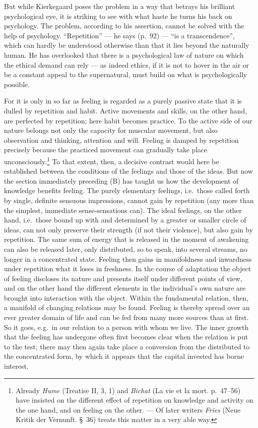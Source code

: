 \documentclass[12pt,a4paper]{book}
\newcommand{\opage}[1]{\marginnote{\footnotesize\textit{[#1]}}}
\begin{document}
\opage{332}But while Kierkegaard poses the problem in a way that betrays
his brilliant psychological eye, it is striking to see with what haste
he turns his back on psychology. The problem, according to his
assertion, cannot be solved with the help of psychology. ``Repetition''
--- he says (p.~92) --- ``is a transcendence'', which can hardly be
understood otherwise than that it lies beyond the naturally human. He
has overlooked that there is a psychological law of nature on which the
ethical demand can rely --- as indeed ethics, if it is not to hover in
the air or be a constant appeal to the supernatural, must build on what
is psychologically possible.

For it is only in so far as feeling is regarded as a purely passive
state that it is dulled by repetition and habit. Active movements and
skills, on the other hand, are perfected by repetition; here habit
becomes practice. To the active side of our nature belongs not only the
capacity for muscular movement, but also observation and thinking,
attention and will. Feeling is damped by repetition precisely because
the practiced movement can gradually take place
unconsciously.\footnote{Already \emph{Hume} (Treatise II, 3, 1) and
\emph{Bichat} (La vie et la mort. p.~47--56) have insisted on the
different effect of repetition on knowledge and activity on the one
hand, and on feeling on the other. --- Of later writers \emph{Fries}
(Neue Kritik der Vernunft. \S~36) treats this matter in a very able
way.} To that extent, then, a decisive contrast would here be
established between the conditions of the feelings and those of the
ideas. But now the section immediately preceding (B) has taught us how
the development of knowledge benefits feeling. The purely elementary
feelings, i.e.\ those called forth by single, definite sensuous
impressions, cannot gain by repetition (any more than the simplest,
immediate sense-sensations can). The ideal feelings, on the other hand,
i.e.\ those bound up with and determined by a greater or smaller circle
of ideas, can not only preserve their strength (if not their violence),
\opage{333}but also gain by repetition. The same sum of energy that is
released in the moment of awakening can also be released later, only
distributed, so to speak, into several streams, no longer in a
concentrated state. Feeling then gains in manifoldness and inwardness
under repetition what it loses in freshness. In the course of adaptation
the object of feeling discloses its nature and presents itself under
different points of view, and on the other hand the different elements
in the individual's own nature are brought into interaction with the
object. Within the fundamental relation, then, a manifold of changing
relations may be found. Feeling is thereby spread over an ever greater
domain of life and can be fed from many more sources than at first. So
it goes, e.g.\ in our relation to a person with whom we live. The inner
growth that the feeling has undergone often first becomes clear when the
relation is put to the test; there may then again take place a
conversion from the distributed to the concentrated form, by which it
appears that the capital invested has borne interest.
\end{document}
